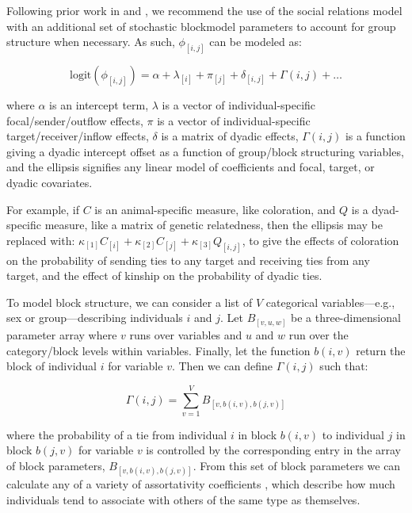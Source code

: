 \documentclass[Afour,sageh,times]{sagej}
\begin{document}
Following prior work in \citet{ross2022modelling} and \citet{redhead2023reliable}, we recommend the use of the social relations model \citep{kenny1984social, snijders1999social, back2010social} with an additional set of stochastic blockmodel parameters \citep{holland1983stochastic, karrer2011stochastic, peixoto2019bayesian} to account for group structure when necessary. As such, $\phi_{[i,j]}$ can be modeled as:
\begin{ceqn}
\begin{equation}\label{link}
\text{logit}(\phi_{[i,j]}) = \alpha + \lambda_{[i]} + \pi_{[j]} + \delta_{[i,j]} + \Gamma(i,j) + \ldots 
\end{equation}
\end{ceqn}
where $\alpha$ is an intercept term, $\lambda$ is a vector of individual-specific focal/sender/outflow effects, $\pi$ is a vector of individual-specific target/receiver/inflow effects, $\delta$ is a matrix of dyadic effects, $\Gamma(i,j)$ is a function giving a dyadic intercept offset as a function of group/block structuring variables, and the ellipsis signifies any linear model of coefficients and focal, target, or dyadic covariates. 

For example, if $C$ is an animal-specific measure, like coloration, and $Q$ is a dyad-specific measure, like a matrix of genetic relatedness, then the ellipsis  may be replaced with:  $\kappa_{[1]}C_{[i]} + \kappa_{[2]}C_{[j]} + \kappa_{[3]}Q_{[i,j]}$, to give the effects of coloration on the probability of sending ties to any target and receiving ties from any target, and the effect of kinship on the probability of dyadic ties.

To model block structure, we can consider a list of $V$ categorical variables---e.g., sex or group---describing individuals $i$ and $j$. Let $B_{[v,u,w]}$ be a three-dimensional parameter array where $v$ runs over variables and $u$ and $w$ run over the category/block levels within variables. Finally, let the function  $b(i,v)$ return the block of individual $i$ for variable $v$. Then we can define $\Gamma(i,j)$ such that: 
\begin{ceqn}
\begin{equation}\label{link}
\Gamma(i,j) = \sum_{v=1}^{V} B_{[v,b(i,v),b(j,v)]} 
\end{equation}
\end{ceqn}
where the probability of a tie from individual $i$ in block $b(i,v)$ to individual $j$ in block $b(j,v)$ for variable $v$ is controlled by the corresponding entry in the array of block parameters, $B_{[v,b(i,v),b(j,v)]}$.
From this set of block parameters we can calculate any of a variety of assortativity coefficients \citep[e.g.,][]{newman2003mixing}, which describe how much individuals tend to associate with others of the same type as themselves.
\end{document}
